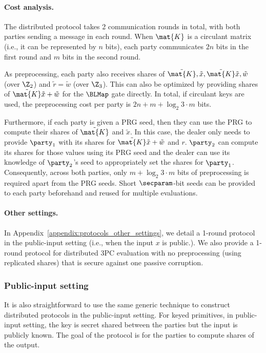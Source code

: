 \paragraph{Cost analysis.}
The distributed protocol takes 2 communication rounds in total, with both parties sending a message in each round. When $\mat{K}$ is a circulant matrix (i.e., it can be represented by $n$ bits), each party communicates $2n$ bits in the first round and $m$ bits in the second round.

As preprocessing, each party also receives shares of $\tilde{\mat{K}}, \tilde{x}, \tilde{\mat{K}}\tilde{x}, \tilde{w}$ (over $\Z_2$) and $\tilde{r} = \tilde{w}$ (over $\Z_3$). This can also be optimized by providing shares of $\tilde{\mat{K}}\tilde{x} + \tilde{w}$ for the $\BLMap$ gate directly. In total, if circulant keys are used, the preprocessing cost per party is $2n + m + \log_2{3}\cdot m$ bits.

Furthermore, if each party is given a PRG seed, then they can use the PRG to compute their shares of $\tilde{\mat{K}}$ and $\tilde{x}$. In this case, the dealer only needs to provide $\party_1$ with its shares for $\tilde{\mat{K}}\tilde{x} + \tilde{w}$ and $r$. $\party_2$ can compute its shares for those values using its PRG seed and the dealer can use its knowledge of $\party_2$'s seed to appropriately set the shares for $\party_1$. Consequently, across both parties, only $m + \log_2{3} \cdot m$ bits of preprocessing is required apart from the PRG seeds. Short $\secparam$-bit seeds can be provided to each party beforehand and reused for multiple evaluations.

\paragraph{Other settings.} In Appendix~\ref{appendix:protocols_other_settings}, we detail a 1-round protocol in the public-input setting (i.e., when the input $x$ is public.). We also provide a 1-round protocol for distributed 3PC evaluation with no preprocessing (using replicated shares) that is secure against one passive corruption.

\fi

\iffull
\subsubsection{Public-input setting}
It is also straightforward to use the same generic technique to construct distributed protocols in the public-input setting. For keyed primitives, in public-input setting, the key is secret shared between the parties but the input is publicly known. The goal of the protocol is for the parties to compute shares of the output.

